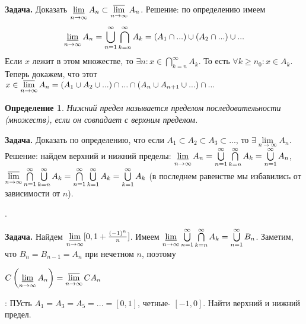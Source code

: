 \documentclass[a4paper]{article}
\newtheorem{defin}{Определение}
\begin{document}
\textbf{Задача.} Доказать $\varliminf\limits_{n \to \infty} A_n\subset
 \varlimsup\limits_{n \to \infty}A_n$. Решение: по определению имеем
$$\varliminf\limits_{n \to \infty} A_n = \bigcup\limits_{n=1}^\infty
\bigcap\limits_{k=n}^\infty A_k=\left( A_1\cap ... \right)\cup
\left( A_2\cap... \right)\cup...$$
Если $x$ лежит в этом множестве, то  
$\exists  n:x\in \bigcap\limits_{k=n}^\infty A_k$. То есть 
$\forall  k\geqslant n_0:x\in A_k$. 
Теперь докажем, что этот $x\in \varlimsup\limits_{n \to \infty} A_n = 
(A_1\cup A_2\cup...)\cap...\cap(A_n\cup A_{n+1}\cup ...)\cap...$
\begin{defin}
Нижний предел называется пределом последовательности (множеств),
если он совпадает с верхним пределом. 
\end{defin} 
\textbf{Задача.} Доказать по определению, что если
$A_1\subset A_2\subset A_3\subset ...$, то 
$\exists  \lim\limits_{n \to \infty} A_n$. Решение: найдем верхний и нижний
пределы:
$\varliminf\limits_{n \to \infty}A_n=\bigcup\limits_{n=1}^\infty
\bigcap\limits_{k=n}^\infty A_k = \bigcup\limits_{n=1}^\infty A_n$,
$\varlimsup\limits_{n \to \infty}\bigcap\limits_{n=1}^\infty
 \bigcup\limits_{k=n}^\infty A_k = \bigcap\limits_{n=1}^\infty
 \bigcup\limits_{k=1}^\infty A_k = \bigcup\limits_{k=1}^\infty A_k$ 
 (в последнем равенстве мы избавились от зависимости от $n$).
 
 .

 \textbf{Задача.} Найдем $\varliminf\limits_{n \to \infty} 
 [0,1+\frac{(-1)^n}{n}]$. Имеем
 $\varliminf\limits_{n \to \infty}\bigcup\limits_{n=1}^\infty
 \bigcap\limits_{k=n}^\infty A_k = \bigcup\limits_{n=1}^\infty B_n$.
 Заметим, что $B_n=B_{n-1}=A_n$ при нечетном $n$, поэтому

 $C\left( \varliminf\limits_{n \to \infty} A_n \right)=
 \varlimsup\limits_{n \to \infty} CA_n $
 
 : ПУсть $A_1=A_3=A_5=...=[0,1]$, четные- $[-1,0]$. Найти верхний и 
 нижний предел. 

\end{document}
